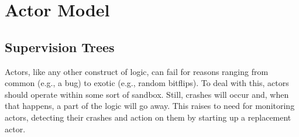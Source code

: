 \section{Actor Model}




\subsection{Supervision Trees}

Actors, like any other construct of logic, can fail for reasons ranging from common (e.g., a bug) to exotic (e.g., random bitflips). To deal with this, actors should operate within some sort of sandbox. Still, crashes will occur and, when that happens, a part of the logic will go away. This raises to need for monitoring actors, detecting their crashes and action on them by starting up a replacement actor.





